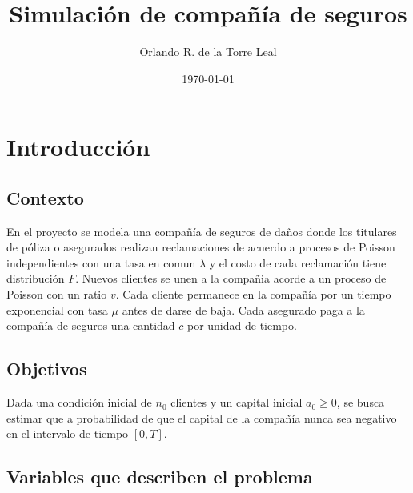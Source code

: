 \documentclass[12pt, a4paper]{article}
\title{Simulación de compañía de seguros}
\author{Orlando R. de la Torre Leal}
\date{\today}
\begin{document}
\maketitle

\section{Introducción} 
\subsection*{Contexto}
En el proyecto se modela una compañía de seguros de daños donde los titulares de póliza o asegurados realizan reclamaciones
de acuerdo a procesos de Poisson independientes con una tasa en comun $\lambda$ y el costo de cada reclamación tiene distribución
$F$. Nuevos clientes se unen a la compañia acorde a un proceso de Poisson con un ratio $v$. Cada cliente permanece en la compañía
por un tiempo exponencial con tasa $\mu$ antes de darse de baja. Cada asegurado paga a la compañía de seguros una cantidad $c$ por 
unidad de tiempo. 

\subsection*{Objetivos}
Dada una condición inicial de $n_0$ clientes y un capital inicial $a_0 \geq 0$, se busca estimar que a probabilidad de que el 
capital de la compañía nunca sea negativo en el intervalo de tiempo $[0, T]$.

\subsection*{Variables que describen el problema}
\end{document}
